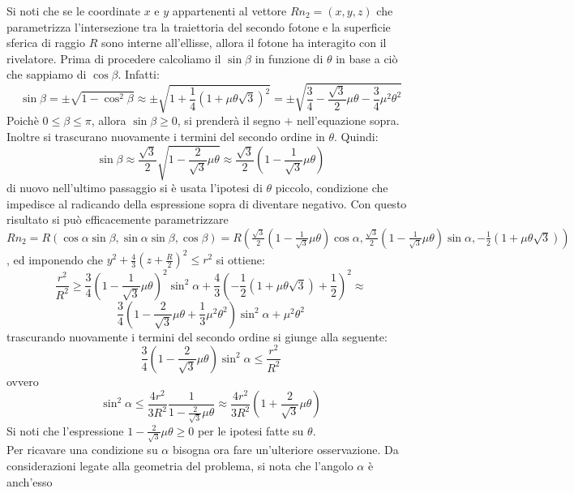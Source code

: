   Si noti che se le coordinate \(x\) e \(y\) appartenenti al vettore \(R n_2 = \left( x, y, z \right)\) che parametrizza l'intersezione tra la traiettoria del secondo fotone e la 
  superficie sferica di raggio \(R\) sono interne all'ellisse, allora il fotone ha interagito con il rivelatore. Prima di procedere calcoliamo il \(\sin \beta \) in funzione di $\theta$ in base a
  ciò che sappiamo di \(\cos \beta\). Infatti: 
  $$ \sin \beta = \pm \sqrt{1 - \cos^2 \beta} \approx \pm \sqrt{1 + \frac{1}{4} \left( 1 + \mu \theta \sqrt{3} \right)^2 } = \pm \sqrt{\frac{3}{4} - \frac{\sqrt{3}}{2} \mu \theta - \frac{3}{4} \mu^2 \theta^2 }  $$
  Poichè \(0 \le \beta \le \pi\), allora \(\sin \beta \ge 0\), si prenderà il segno \(+\) nell'equazione sopra. Inoltre si trascurano nuovamente i termini del secondo ordine in \(\theta\).
  Quindi:
  $$ \sin \beta \approx \frac{\sqrt{3}}{2} \sqrt {1 - \frac{2}{\sqrt{3}} \mu \theta} \approx \frac{\sqrt{3}}{2} \left(1 - \frac{1}{\sqrt{3}} \mu \theta \right)  $$
  di nuovo nell'ultimo passaggio si è usata l'ipotesi di \(\theta\) piccolo, condizione che impedisce al radicando della espressione sopra di diventare negativo.
  Con questo risultato si può efficacemente parametrizzare \(R n_2 = R \left( \cos \alpha \sin \beta , \sin \alpha \sin \beta, \cos \beta  \right) = 
  R \left( \frac{\sqrt{3}}{2} \left(1 - \frac{1}{\sqrt{3}} \mu \theta \right) \cos \alpha , \frac{\sqrt{3}}{2} \left(1 - \frac{1}{\sqrt{3}} \mu \theta \right) \sin \alpha ,
  -\frac{1}{2} \left( 1 + \mu \theta \sqrt{3} \right) \right)\), ed imponendo che \(y^2 + \frac{4}{3} \left( z + \frac{R}{2} \right)^2 \le r^2 \) si ottiene:
  $$ \frac{r^2}{R^2} \ge \frac{3}{4} \left(1 - \frac{1}{\sqrt{3}} \mu \theta \right)^2 \sin^2 \alpha + \frac{4}{3} \left( -\frac{1}{2} \left( 1 + \mu \theta \sqrt{3} \right) + \frac{1}{2} \right)^2 \approx  $$
  $$ \frac{3}{4} \left(1 - \frac{2}{\sqrt{3}} \mu \theta + \frac{1}{3} \mu^2 \theta^2 \right)\sin^2\alpha + \mu^2 \theta^2 $$
  trascurando nuovamente i termini del secondo ordine si giunge alla seguente:
  $$ \frac{3}{4} \left(1 - \frac{2}{\sqrt{3}} \mu \theta \right)\sin^2\alpha \le \frac{r^2}{R^2} $$
  ovvero
  $$ \sin^2\alpha \le \frac{4r^2}{3R^2} \frac{1}{1 - \frac{2}{\sqrt{3}} \mu \theta} \approx \frac{4r^2}{3R^2} \left(1 + \frac{2}{\sqrt{3}} \mu \theta \right)  $$
  Si noti che l'espressione \(1 - \frac{2}{\sqrt{3}} \mu \theta \ge 0\) per le ipotesi fatte su \(\theta\).\\
  Per ricavare una condizione su \(\alpha\) bisogna ora fare un'ulteriore osservazione. Da considerazioni legate alla geometria del problema, si nota che l'angolo \(\alpha\) è anch'esso
